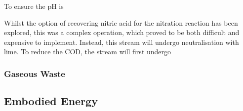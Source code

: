 To ensure the pH is 

Whilst the option of recovering nitric acid for the nitration reaction has been explored, this was a complex operation, which proved to be both difficult and expensive to implement. Instead, this stream will undergo neutralisation with lime. To reduce the COD, the stream will first undergo



\subsubsection{Gaseous Waste}

\subsection{Embodied Energy}
